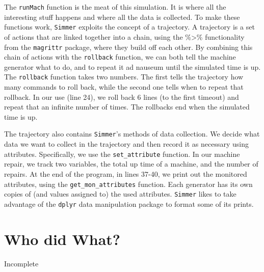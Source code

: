 \documentclass[a4paper, 11pt]{article} %
\begin{document}
The \texttt{runMach} function is the meat of this simulation. It is where all the interesting stuff happens and where all the data is collected. To make these functions work, \texttt{Simmer} exploits the concept of a trajectory. A trajectory is a set of actions that are linked together into a chain, using the \%>\% functionality from the \texttt{magrittr} package, where they build off each other. By combining this chain of actions with the \texttt{rollback} function, we can both tell the machine generator what to do, and to repeat it ad nauseum until the simulated time is up. The \texttt{rollback} function takes two numbers. The first tells the trajectory how many commands to roll back, while the second one tells when to repeat that rollback. In our use (line 24), we roll back 6 lines (to the first timeout) and repeat that an infinite number of times. The rollbacks end when the simulated time is up.

The trajectory also contains \texttt{Simmer}'s methods of data collection. We decide what data we want to collect in the trajectory and then record it as necessary using attributes. Specifically, we use the \texttt{set\_attribute} function. In our machine repair, we track two variables, the total up time of a machine, and the number of repairs. At the end of the program, in lines 37-40, we print out the monitored attributes, using the \texttt{get\_mon\_attributes} function. Each generator has its own copies of (and values assigned to) the used attributes. \texttt{Simmer} likes to take advantage of the \texttt{dplyr} data manipulation package to format some of its prints. \newline


\pagebreak


\pagebreak


\section{Who did What?}

Incomplete

\end{document}
